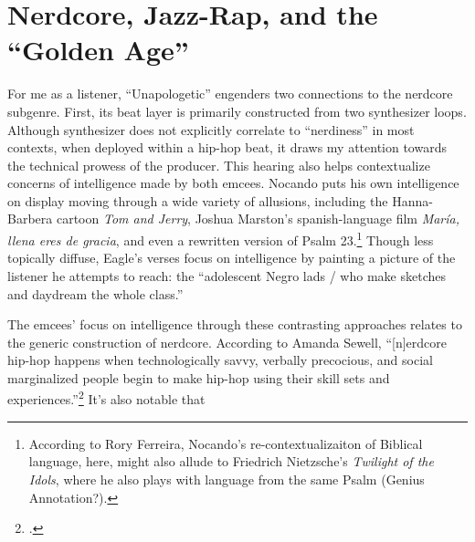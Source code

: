 \section{Nerdcore, Jazz-Rap, and the ``Golden Age''}

For me as a listener, ``Unapologetic'' engenders two connections to the nerdcore subgenre. First, its beat 
layer is primarily constructed from two synthesizer loops. Although synthesizer does not explicitly
correlate to ``nerdiness'' in most contexts, when deployed within a hip-hop beat, it draws my attention
towards the technical prowess of the producer. This hearing also helps contextualize concerns of intelligence
made by both emcees. Nocando puts his own intelligence on display moving through a wide variety of allusions, 
including the Hanna-Barbera cartoon \textit{Tom and Jerry}, Joshua Marston's spanish-language film 
\textit{María, llena eres de gracia}, and even a rewritten version of Psalm 23.\footnote{
    According to Rory Ferreira, Nocando's re-contextualizaiton of Biblical language, here, might also 
    allude to Friedrich Nietzsche's \textit{Twilight of the Idols}, where he also plays with language
    from the same Psalm (Genius Annotation?).} 
Though less topically diffuse, Eagle's verses focus on intelligence by painting a picture of the listener he
attempts to reach: the ``adolescent Negro lads / who make sketches and daydream the whole class.''

The emcees' focus on intelligence through these contrasting approaches relates to the generic construction of
nerdcore. According to Amanda Sewell, ``[n]erdcore hip-hop happens when technologically savvy, verbally precocious,
and social marginalized people begin to make hip-hop using their skill sets and experiences.''\footnote{
    \autocite[223]{amandasewellNerdcoreHiphop2015}.}
It's also notable that
   
